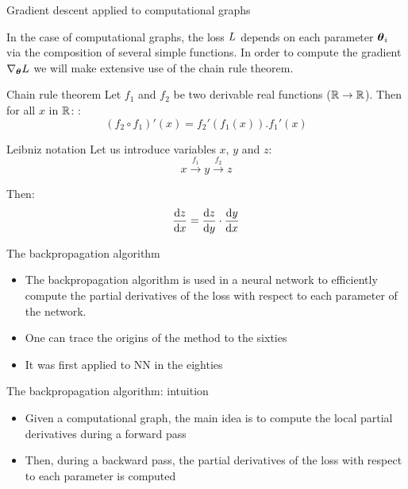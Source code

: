 \documentclass[xcolor=pdftex,dvipsnames,table,mathserif]{beamer}
\begin{document}
\begin{frame}{Gradient descent applied to computational graphs}

  In the case of computational graphs, the loss $L$ depends on each parameter $\boldsymbol{\theta}_i$ via the composition of several simple functions. In order to compute the gradient $\nabla_{\boldsymbol{\theta}}L$ we will make extensive use of the chain rule theorem.

  \begin{block}{Chain rule theorem}
    Let $f_1$ and $f_2$ be two derivable real functions ($\mathbb{R} \rightarrow \mathbb{R}$). Then for all $x$ in $\mathbb{R}$:   :
    \[
     (f_2 \circ f_1)'(x) = f_2'(f_1(x)).f_1'(x)
    \]
  \end{block}


\begin{block}{Leibniz notation}
  Let us introduce variables $x$, $y$ and $z$:
  \[x \xrightarrow{f_1} y \xrightarrow{f_2} z\]

  Then:
  \[\dv{z}{x} = \dv{z}{y} \cdot \dv{y}{x} \]

\end{block}

\end{frame}


\begin{frame}{The backpropagation algorithm}

  \begin{itemize}
  \item The backpropagation algorithm is used in a neural network to efficiently compute the partial derivatives of the loss with respect to each parameter of the network.
  \item One can trace the origins of the method to the sixties
  \item It was first applied to NN in the eighties \cite{werbos_applications_1982, lecun_procedure_1985}
  \end{itemize}


\end{frame}


\begin{frame}{The backpropagation algorithm: intuition}

  \begin{itemize}
  \item Given a computational graph, the main idea is to compute the local partial derivatives during a forward pass
    \item Then, during a backward pass, the partial derivatives of the loss with respect to each parameter is computed
  \end{itemize}


\end{frame}
\end{document}
